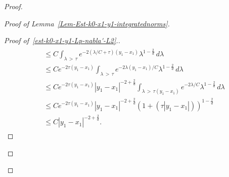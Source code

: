 \documentclass[AHL,Unicode,longabstracts]{cedram}
\renewcommand{\leq}{\leqslant}
\begin{document}
\begin{proof}
\begin{proof}[Proof of Lemma~\ref{Lem-Est-k0-x1-y1-integratednorms}]
\begin{proof}[{Proof of~\eqref{est-k0-x1-y1-Lp-nabla'-L2}.}]
\begin{multline*}
\begin{aligned}
&\leq C \int_{\lambda\,>\,\tau} e^{-2(\lambda/C + \tau)(y_1 - x_1)} \lambda^{1-\frac{2}{d}} \, d \lambda
\\
&\leq C e^{- 2 \tau (y_1 - x_1)}
\int_{\lambda\,>\,\tau} e^{-2\lambda(y_1 - x_1)/C} \lambda^{1-\frac{2}{d}} \, d \lambda
\\
&\leq Ce^{- 2 \tau (y_1 - x_1)} |y_1 -x_1|^{-2+\frac{2}{d}} \int_{\lambda\,>\,\tau (y_1 - x_1)} e^{-2 \lambda/C} \lambda^{1-\frac{2}{d}} \, d\lambda
\\
&\leq C e^{-2\tau(y_1 -x_1)}|y_1 -x_1|^{-2+ \frac{2}{d}} (1+ (\tau |y_1 -x_1|))^{1-\frac{2}{d}}
\\
&
\leq C |y_1-x_1|^{-2+\frac{2}{d}}.
\end{aligned}
\end{multline*}


\end{proof}
\end{proof}
\end{proof}
\end{document}
